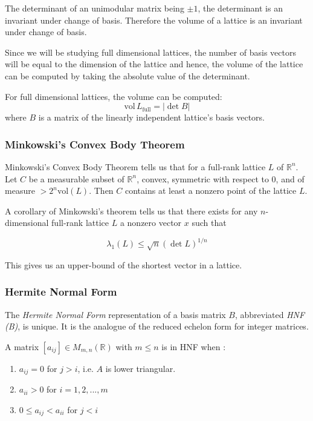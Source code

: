 \documentclass[10pt, a4paper]{article}
\begin{document}
The determinant of an unimodular matrix being $\pm 1$, the determinant is an invariant under change of basis. Therefore the volume of a lattice is an invariant under change of basis.

Since we will be studying full dimensional lattices, the number of basis vectors will be equal to the dimension of the lattice and hence, the volume of the lattice can be computed by taking the absolute value of the determinant.

For full dimensional lattices, the volume can be computed:
\[
\text{vol} \,L_{\text{full}} = |\det B|
\] where $B$ is a matrix of the linearly independent lattice's basis vectors.


\subsubsection{Minkowski's Convex Body Theorem}

Minkowski's Convex Body Theorem tells us that for a full-rank lattice $L$ of $\mathbb{R}^n$. Let $C$ be a measurable subset of $\mathbb{R}^n$, convex, symmetric with respect to 0, and of measure $> 2^n \text{vol}(L)$. Then $C$ contains at least a nonzero point of the lattice $L$.

A corollary of Minkowski's theorem tells us that there exists for any $n$-dimensional full-rank lattice $L$ a nonzero vector $x$ such that

\[
\lambda_1(L) \leq \sqrt{n} (\det L)^{1/n}
\]

This gives us an upper-bound of the shortest vector in a lattice.

\subsubsection{Hermite Normal Form}

The \emph{Hermite Normal Form} representation of a basis matrix $B$, abbreviated \emph{HNF (B)}, is unique. It is the analogue of the reduced echelon form for integer matrices.

A matrix $[a_{ij}] \in M_{m,n} (\mathbb{R})$ with $m \leq n$ is in HNF when\cite{SchnorrStanfordNotes} :
\begin{enumerate}
\item $a_{ij} = 0$ for $j > i$, i.e. $A$ is lower triangular. 
\item $a_{ii} > 0$ for $i=1,2,...,m$
\item $0 \leq a_{ij} < a_{ii}$ for $j < i$
\end{enumerate}
\end{document}
